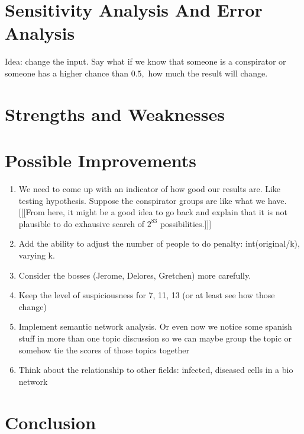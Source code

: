 \documentclass{icmmcm}
\begin{document}

\section{Sensitivity Analysis And Error Analysis}
Idea: change the input. Say what if we know that someone is a conspirator
or someone has a higher chance than $0.5,$
how much the result will change.
\section{Strengths and Weaknesses}

\section{Possible Improvements}
\begin{enumerate}
\item We need to come up with an indicator of how good our results are.
Like testing hypothesis. Suppose the conspirator groups are 
like what we have. [[[From here, it might be a good idea to go back
and explain that it is not plausible to do exhausive search of
$2^{83}$ possibilities.]]]
\item Add the ability to adjust the number of people to do penalty: int(original/k), varying k.
\item Consider the bosses (Jerome, Delores, Gretchen) more carefully.
\item Keep the level of suspiciousness for 7, 11, 13 (or at least see how those change)
\item Implement semantic network analysis. 
	Or even now we notice some spanish stuff in more than one topic discussion
	so we can maybe group the topic or somehow tie the scores of those topics together
\item Think about the relationship to other fields: infected, diseased cells in a bio network
\end{enumerate}
		

\section{Conclusion}
\end{document}
